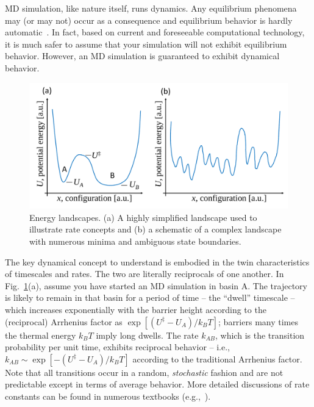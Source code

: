 \documentclass[9pt,bestpractices]{livecoms}
\begin{document}
MD simulation, like nature itself, runs dynamics.  
Any equilibrium phenomena may (or may not) occur as a consequence and equilibrium behavior is hardly automatic~\cite{Zuckerman:2010:}.  
In fact, based on current and foreseeable computational technology, it is much safer to assume that your simulation will not exhibit equilibrium behavior.  
However, an MD simulation is guaranteed to exhibit dynamical behavior.

\begin{figure}[h]
\centering
\includegraphics[width=\linewidth]{simplelandscapes.pdf}
\caption{Energy landscapes.  (a) A highly simplified landscape used to illustrate rate concepts and (b) a schematic of a complex landscape with numerous minima and ambiguous state boundaries.}
\label{landscapes}
\end{figure}

The key dynamical concept to understand is embodied in the twin characteristics of timescales and rates.  
The two are literally reciprocals of one another.  
In Fig.\ \ref{landscapes}(a), assume you have started an MD simulation in basin A.  
The trajectory is likely to remain in that basin for a period of time -- the “dwell” timescale -- which increases exponentially with the barrier height according to the (reciprocal) Arrhenius factor as $\exp[(U^\ddagger - U_A)/k_B T]$; barriers many times the thermal energy $k_BT$ imply long dwells.  
The rate $k_{AB}$, which is the transition probability per unit time, exhibits reciprocal behavior -- i.e., $k_{AB} \sim \exp[-(U^\ddagger - U_A)/k_B T]$ according to the traditional Arrhenius factor.  
Note that all transitions occur in a random, \emph{stochastic} fashion and are not predictable except in terms of average behavior.  
More detailed discussions of rate constants can be found in numerous textbooks (e.g.,~\cite{DillBook, Zuckerman:2010:}).
\end{document}
